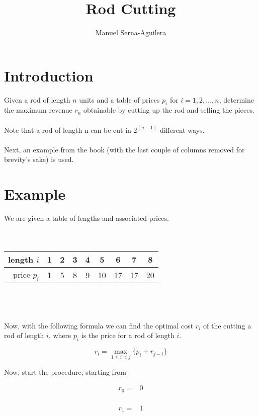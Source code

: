 \documentclass[12pt]{article}
\title{Rod Cutting}
\author{Manuel Serna-Aguilera}
\date{}
\begin{document}
\maketitle

\section*{Introduction}
Given a rod of length $n$ units and a table of prices $p_i$ for $i = 1, 2, \ldots, n$, determine the maximum revenue $r_n$ obtainable by cutting up the rod and selling the pieces.
\\ \\
Note that a rod of length n can be cut in $2^{(n-1)}$ different ways.
\\ \\
Next, an example from the book (with the last couple of columns removed for brevity's sake) is used.

\section*{Example}
We are given a table of lengths and associated prices.
\\ \\ \\
\begin{tabular}{ | r | c c c c c c c c |}
\hline
length $i$  & 1 & 2 & 3 & 4 & 5 & 6 & 7 & 8 \\ \hline
price $p_i$ & 1 & 5 & 8 & 9 & 10 & 17 & 17 & 20 \\ \hline
\end{tabular}
\\ \\ \\
Now, with the following formula we can find the optimal cost $r_i$ of the cutting a rod of length $i$, where $p_i$ is the price for a rod of length $i$. 

\begin{equation*}
    r_i = \max\limits_{1 \leq i < j}\{p_i + r_{j-i}\}
\end{equation*}

Now, start the procedure, starting from 

\begin{equation*} \label{rc0}
\begin{split}
r_0 = & 0 \\
\end{split}
\end{equation*}

\begin{equation*} \label{rc1}
\begin{split}
r_1 = & 1 \\
\end{split}
\end{equation*}
\end{document}
